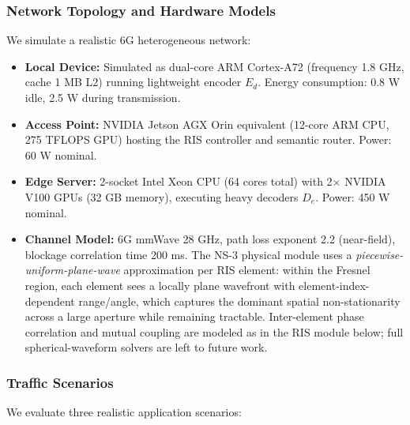 \documentclass{BVP_CINC}
\begin{document}
\subsubsection{Network Topology and Hardware Models}
We simulate a realistic 6G heterogeneous network:
\begin{itemize}
    \item \textbf{Local Device:} Simulated as dual-core ARM Cortex-A72 (frequency 1.8 GHz, cache 1 MB L2) running lightweight encoder $E_d$. Energy consumption: 0.8 W idle, 2.5 W during transmission.
    \item \textbf{Access Point:} NVIDIA Jetson AGX Orin equivalent (12-core ARM CPU, 275 TFLOPS GPU) hosting the RIS controller and semantic router. Power: 60 W nominal.
    \item \textbf{Edge Server:} 2-socket Intel Xeon CPU (64 cores total) with 2$\times$ NVIDIA V100 GPUs (32 GB memory), executing heavy decoders $D_e$. Power: 450 W nominal.
    \item \textbf{Channel Model:} 6G mmWave 28 GHz, path loss exponent 2.2 (near-field), blockage correlation time 200 ms. The NS-3 physical module uses a \emph{piecewise-uniform-plane-wave} approximation per RIS element: within the Fresnel region, each element sees a locally plane wavefront with element-index-dependent range/angle, which captures the dominant spatial non-stationarity across a large aperture while remaining tractable. Inter-element phase correlation and mutual coupling are modeled as in the RIS module below; full spherical-waveform solvers are left to future work.
\end{itemize}

\subsubsection{Traffic Scenarios}
We evaluate three realistic application scenarios:
\end{document}
